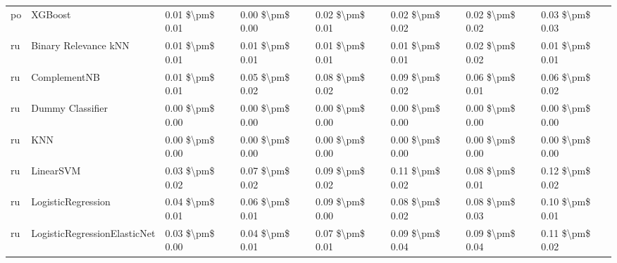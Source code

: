 \begin{tabular}{llllllll}
      po &                         XGBoost & 0.01 \$\textbackslash pm\$ 0.01 &           0.00 \$\textbackslash pm\$ 0.00 &       0.02 \$\textbackslash pm\$ 0.01 &        0.02 \$\textbackslash pm\$ 0.02 &                         0.02 \$\textbackslash pm\$ 0.02 &     0.03 \$\textbackslash pm\$ 0.03 \\
      ru &            Binary Relevance kNN & 0.01 \$\textbackslash pm\$ 0.01 &           0.01 \$\textbackslash pm\$ 0.01 &       0.01 \$\textbackslash pm\$ 0.01 &        0.01 \$\textbackslash pm\$ 0.01 &                         0.02 \$\textbackslash pm\$ 0.02 &     0.01 \$\textbackslash pm\$ 0.01 \\
      ru &                    ComplementNB & 0.01 \$\textbackslash pm\$ 0.01 &           0.05 \$\textbackslash pm\$ 0.02 &       0.08 \$\textbackslash pm\$ 0.02 &        0.09 \$\textbackslash pm\$ 0.02 &                         0.06 \$\textbackslash pm\$ 0.01 &     0.06 \$\textbackslash pm\$ 0.02 \\
      ru &                Dummy Classifier & 0.00 \$\textbackslash pm\$ 0.00 &           0.00 \$\textbackslash pm\$ 0.00 &       0.00 \$\textbackslash pm\$ 0.00 &        0.00 \$\textbackslash pm\$ 0.00 &                         0.00 \$\textbackslash pm\$ 0.00 &     0.00 \$\textbackslash pm\$ 0.00 \\
      ru &                             KNN & 0.00 \$\textbackslash pm\$ 0.00 &           0.00 \$\textbackslash pm\$ 0.00 &       0.00 \$\textbackslash pm\$ 0.00 &        0.00 \$\textbackslash pm\$ 0.00 &                         0.00 \$\textbackslash pm\$ 0.00 &     0.00 \$\textbackslash pm\$ 0.00 \\
      ru &                       LinearSVM & 0.03 \$\textbackslash pm\$ 0.02 &           0.07 \$\textbackslash pm\$ 0.02 &       0.09 \$\textbackslash pm\$ 0.02 &        0.11 \$\textbackslash pm\$ 0.02 &                         0.08 \$\textbackslash pm\$ 0.01 &     0.12 \$\textbackslash pm\$ 0.02 \\
      ru &              LogisticRegression & 0.04 \$\textbackslash pm\$ 0.01 &           0.06 \$\textbackslash pm\$ 0.01 &       0.09 \$\textbackslash pm\$ 0.00 &        0.08 \$\textbackslash pm\$ 0.02 &                         0.08 \$\textbackslash pm\$ 0.03 &     0.10 \$\textbackslash pm\$ 0.01 \\
      ru &    LogisticRegressionElasticNet & 0.03 \$\textbackslash pm\$ 0.00 &           0.04 \$\textbackslash pm\$ 0.01 &       0.07 \$\textbackslash pm\$ 0.01 &        0.09 \$\textbackslash pm\$ 0.04 &                         0.09 \$\textbackslash pm\$ 0.04 &     0.11 \$\textbackslash pm\$ 0.02 \\

\end{tabular}
